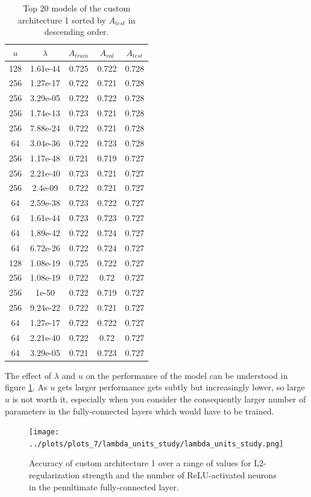 \begin{table}[ht]
\centering
\begin{tabular}{ |c|c|c|c|c| }
\hline
$u$ & $\lambda$ & $A_{train}$ & $A_{val}$ & $A_{test}$ \\
\hline
128 & 1.61e-44 & 0.725 & 0.722 & 0.728 \\
256 & 1.27e-17 & 0.722 & 0.721 & 0.728 \\
256 & 3.29e-05 & 0.722 & 0.722 & 0.728 \\
256 & 1.74e-13 & 0.723 & 0.721 & 0.728 \\
256 & 7.88e-24 & 0.722 & 0.721 & 0.728 \\
64 & 3.04e-36 & 0.722 & 0.723 & 0.728 \\
256 & 1.17e-48 & 0.721 & 0.719 & 0.727 \\
256 & 2.21e-40 & 0.723 & 0.721 & 0.727 \\
256 & 2.4e-09 & 0.722 & 0.721 & 0.727 \\
64 & 2.59e-38 & 0.723 & 0.722 & 0.727 \\
64 & 1.61e-44 & 0.723 & 0.723 & 0.727 \\
64 & 1.89e-42 & 0.722 & 0.724 & 0.727 \\
64 & 6.72e-26 & 0.722 & 0.724 & 0.727 \\
128 & 1.08e-19 & 0.725 & 0.722 & 0.727 \\
256 & 1.08e-19 & 0.722 & 0.72 & 0.727 \\
256 & 1e-50 & 0.722 & 0.719 & 0.727 \\
256 & 9.24e-22 & 0.722 & 0.721 & 0.727 \\
64 & 1.27e-17 & 0.722 & 0.722 & 0.727 \\
64 & 2.21e-40 & 0.722 & 0.72 & 0.727 \\
64 & 3.29e-05 & 0.721 & 0.723 & 0.727 \\
\hline
\end{tabular}
\caption{Top 20 models of the custom architecture 1 sorted by $A_{test}$ in descending order.}
\label{table:top20_custom1}
\end{table}

The effect of $\lambda$ and $u$ on the performance of the model can be understood in figure \ref{fig:lambda_units_study_custom1}. As $u$ gets larger performance gets subtly but increasingly lower, so large $u$ is not worth it, especially when you consider the consequently larger number of parameters in the fully-connected layers which would have to be trained.

\begin{figure}[ht]
    \centering
    \texttt{[image: ../plots/plots\_7/lambda\_units\_study/lambda\_units\_study.png]}
    \caption{Accuracy of custom architecture 1 over a range of values for L2-regularization strength and the number of ReLU-activated neurons in the penultimate fully-connected layer.}
    \label{fig:lambda_units_study_custom1}
\end{figure}

